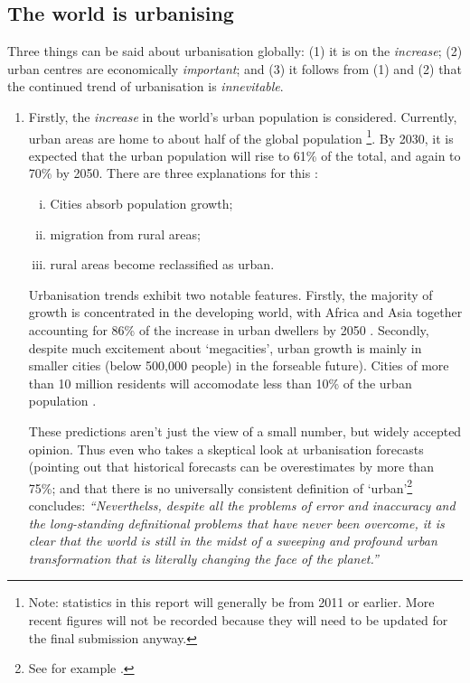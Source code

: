 \subsection{The world is urbanising}
Three things can be said about urbanisation globally: (1) it is on the \emph{increase}; (2) urban centres are economically \emph{important}; and (3) it follows from (1) and (2) that the continued trend of urbanisation is \emph{innevitable}. 
\begin{enumerate}
	\item Firstly, the \emph{increase} in the world's urban population is considered. Currently, urban areas are home to about half of the global population \citep{AREAS2012}\footnote{Note: statistics in this report will generally be from 2011 or earlier. More recent figures will not be recorded because they will need to be updated for the final submission anyway.}. By 2030, it is expected that the urban population will rise to 61\% of the total, and again to 70\% by 2050. There are three explanations for this \citep{Cohen2006}:
	\begin{enumerate}[(i)]
		\item Cities absorb population growth; 
		\item migration from rural areas;
		\item rural areas become reclassified as urban. 
	\end{enumerate}	
	Urbanisation trends exhibit two notable features. Firstly, the majority of growth is concentrated in the developing world, with Africa and Asia together accounting for 86\% of the increase in urban dwellers by 2050 \citep{York2011}. Secondly, despite much excitement about `megacities', urban growth is mainly in smaller cities (below 500,000 people) in the forseable future). Cities of more than 10 million residents will accomodate less than 10\% of the urban population \citep{Cohen2006}.

These predictions aren't just the view of a small number, but widely accepted opinion. Thus even \citet{Cohen2004} who takes a skeptical look at urbanisation forecasts (pointing out that historical forecasts can be overestimates by more than 75\%; and that there is no universally consistent definition of `urban'\footnote{See for example \citet{DepartmentforCommunitiesandLocalGovernment2006}.} concludes: \emph{``Neverthelss, despite all the problems of error and inaccuracy and the long-standing definitional problems that have never been overcome, it is clear that the world is still in the midst of a sweeping and profound urban transformation that is literally changing the face of the planet.''}


\end{enumerate}
